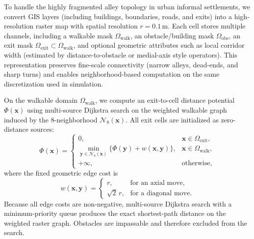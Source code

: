 \documentclass[preprint,12pt]{elsarticle}
\begin{document}
To handle the highly fragmented alley topology in urban informal settlements, we convert GIS layers
(including buildings, boundaries, roads, and exits) into a high-resolution raster map with spatial
resolution $r=0.1$\,m. Each cell stores multiple channels, including a walkable mask
$\Omega_{\mathrm{walk}}$, an obstacle/building mask $\Omega_{\mathrm{obs}}$, an exit mask
$\Omega_{\mathrm{exit}}\subset\Omega_{\mathrm{walk}}$, and optional geometric attributes such as local
corridor width (estimated by distance-to-obstacle or medial-axis style operators). This
representation preserves fine-scale connectivity (narrow alleys, dead-ends, and sharp turns) and
enables neighborhood-based computation on the same discretization used in simulation.

On the walkable domain $\Omega_{\mathrm{walk}}$, we compute an exit-to-cell distance potential
$\Phi(\mathbf{x})$ using multi-source Dijkstra search on the weighted walkable graph induced by the
8-neighborhood $\mathcal{N}_8(\mathbf{x})$. All exit cells are initialized as zero-distance sources:
\begin{equation}
\Phi(\mathbf{x})=
\begin{cases}
0, & \mathbf{x}\in\Omega_{\mathrm{exit}},\\
\min_{\mathbf{y}\in\mathcal{N}_8(\mathbf{x})}\{\Phi(\mathbf{y})+w(\mathbf{x},\mathbf{y})\}, & \mathbf{x}\in\Omega_{\mathrm{walk}},\\
+\infty, & \text{otherwise},
\end{cases}
\label{eq:potential-dijkstra}
\end{equation}
where the fixed geometric edge cost is
\begin{equation}
w(\mathbf{x},\mathbf{y})=
\begin{cases}
r, & \text{for an axial move},\\
\sqrt{2}\,r, & \text{for a diagonal move}.
\end{cases}
\end{equation}
Because all edge costs are non-negative, multi-source Dijkstra search with a minimum-priority queue
produces the exact shortest-path distance on the weighted raster graph. Obstacles are impassable and
therefore excluded from the search.
\end{document}
